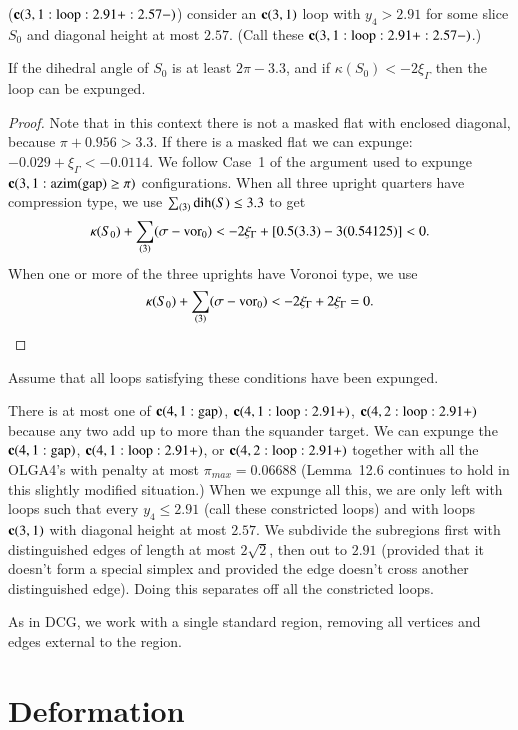 (${\operatorname{\bf c}}{(3,1:{\operatorname{loop}}:2.91+:2.57-)}$) consider an ${\operatorname{\bf c}}{(3,1)}$ loop with $y_4>2.91$ for some slice $S_0$ and diagonal
height at most $2.57$.  (Call these ${\operatorname{\bf c}}{(3,1:{\operatorname{loop}}:2.91+:2.57-)}$.)  
\begin{lemma}
If the dihedral angle of $S_0$ is at least $2\pi - 3.3$, and if $\kappa(S_0)< -2\xi_\Gamma$
then the loop can be expunged.
\end{lemma}
\begin{proof}
Note that in this context there is not a masked flat with enclosed diagonal, because $\pi + 0.956 > 3.3$.  If there is a masked flat
we can expunge: $-0.029 + \xi_\Gamma < -0.0114$.  We follow Case~1 of the argument used to expunge ${\operatorname{\bf c}}{(3,1: {\operatorname{azim}}({\operatorname{gap}}) \ge \pi)}$ configurations. 
When all three upright quarters have compression type, we use
$\sum_{(3)} {\operatorname{dih}}(S) \le 3.3$ to get
   $$\kappa(S_0) + \sum_{(3)}(\sigma-{\operatorname{vor}}_0) < 
      - 2\xi_\Gamma + [0.5 (3.3) - 3 (0.54125)] < 0.$$
When one or more of the three uprights have Voronoi type, we use
  $$\kappa(S_0) + \sum_{(3)}(\sigma - {\operatorname{vor}}_0 ) <
    -2 \xi_\Gamma
    +2 \xi_\Gamma
     =0.$$
\end{proof}
Assume that all loops satisfying these conditions have been expunged.



There is at most one of ${\operatorname{\bf c}}{(4,1:{\operatorname{gap}})}$, ${\operatorname{\bf c}}{(4,1:{\operatorname{loop}}:2.91+)}$, ${\operatorname{\bf c}}{(4,2:{\operatorname{loop}}:2.91+)}$  because any two add up to more
than the squander target.  We can expunge the ${\operatorname{\bf c}}{(4,1:{\operatorname{gap}})}$, ${\operatorname{\bf c}}{(4,1:{\operatorname{loop}}:2.91+)}$, or ${\operatorname{\bf c}}{(4,2:{\operatorname{loop}}:2.91+)}$ together
with all the OLGA4's with penalty at most $\pi_{max}=0.06688$ (Lemma~12.6 continues
to hold in this slightly modified situation.)  When we expunge all this,
we are only left with loops such that every $y_4\le 2.91$ (call these constricted loops) and with loops ${\operatorname{\bf c}}{(3,1)}$
with diagonal height at most $2.57$.    We subdivide the subregions first with
distinguished edges of length at most $2\sqrt2$, then out to $2.91$ (provided
that it doesn't form a special simplex and provided the edge doesn't cross another distinguished edge).  Doing this separates off all the
constricted loops.  

As in DCG, we work with a single standard region, 
removing all vertices and edges
external to the region.

\section{Deformation}

